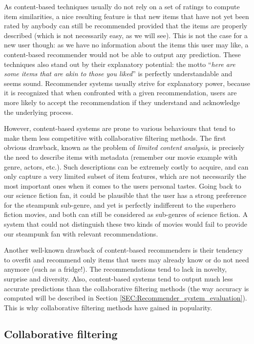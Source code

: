 As content-based techniques usually do not rely on a set of ratings to compute item
similarities, a nice resulting feature is that new items that have not yet been
rated by anybody can still be recommended provided that the items are properly
described (which is not necessarily easy, as we will see). This is not the case for a new user
though: as we have no information about the items this user may like, a
content-based recommender would not be able to output any prediction. These
techniques also stand out by their explanatory potential: the motto
``\textit{here are some items that are akin to those you liked}'' is perfectly
understandable and seems sound.  Recommender systems usually strive for
explanatory power, because it is recognized that when confronted with a given
recommendation, users are more likely to accept the recommendation if they
understand and acknowledge the underlying process.

However, content-based systems are prone to various behaviours that tend to make
them less competitive with collaborative filtering methods. The first obvious drawback, known as
the problem of \textit{limited content analysis}, is precisely the need to
describe items with metadata (remember our movie example with
genre, actors, etc.). Such descriptions can be extremely costly to acquire, and can only
capture a very limited subset of item features, which are not necessarily the
most important ones when it comes to the users personal tastes. Going back to
our science fiction fan, it could be plausible that the user has a strong
preference for the steampunk sub-genre, and yet is perfectly indifferent to the
superhero fiction movies, and both can still be considered as sub-genres of
science fiction. A system that could not distinguish these two kinds of movies
would fail to provide our steampunk fan with relevant recommendations.

Another well-known drawback of content-based recommenders is their tendency to
overfit and recommend only items that users may already know or do not need
anymore (such as a fridge!). The recommendations tend to lack in novelty,
surprise and diversity. Also, content-based systems tend to output much less
accurate predictions than the collaborative filtering methods (the way accuracy
is computed will be described in Section
\ref{SEC:Recommender_system_evaluation}). This is why collaborative filtering
methods have gained in popularity.

\subsection{Collaborative filtering}

